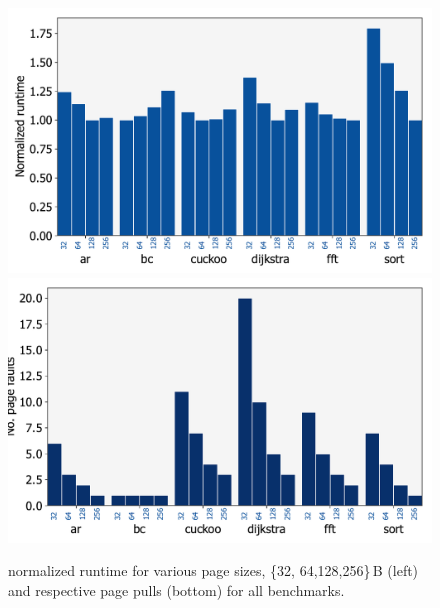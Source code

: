 \begin{figure}
	\centering
	\includegraphics[width=0.49\columnwidth]{figures/page_exec-time}
	\includegraphics[width=0.49\columnwidth]{figures/pagePulls}
	\caption{\sys normalized runtime for various page sizes, \{32, 64,128,256\}\,B (left) and respective page pulls (bottom) for all benchmarks.}
	\label{fig:page_size}
\end{figure}

%


